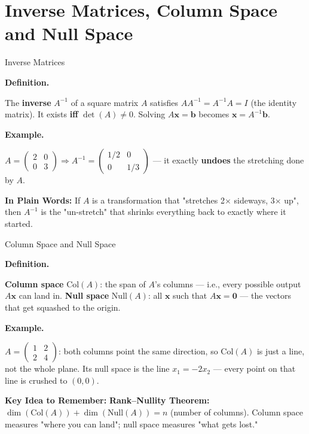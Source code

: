 \documentclass[9pt,aspectratio=169]{beamer}
\newcommand{\keyidea}[1]{%
\par\medskip\noindent\textbf{Key Idea to Remember:} #1\par\medskip}
\newcommand{\childex}[1]{%
\par\medskip\noindent\textbf{In Plain Words:} #1\par\medskip}
\begin{document}
\section{Inverse Matrices, Column Space and Null Space}

\begin{frame}{Inverse Matrices}
\par\noindent\textbf{Definition.}\par
The \textbf{inverse} $A^{-1}$ of a square matrix $A$ satisfies $AA^{-1}=A^{-1}A=I$ (the
identity matrix). It exists \textbf{iff} $\det(A)\neq 0$. Solving $A\mathbf{x}=\mathbf{b}$
becomes $\mathbf{x}=A^{-1}\mathbf{b}$.
\medskip


\par\noindent\textbf{Example.}\par
$A=\begin{pmatrix}2&0\\0&3\end{pmatrix} \Rightarrow A^{-1}=\begin{pmatrix}1/2&0\\0&1/3
\end{pmatrix}$ --- it exactly \textbf{undoes} the stretching done by $A$.
\medskip


\childex{If $A$ is a transformation that "stretches 2$\times$ sideways, 3$\times$ up",
then $A^{-1}$ is the "un-stretch" that shrinks everything back to exactly where it
started.}
\end{frame}

\begin{frame}{Column Space and Null Space}
\par\noindent\textbf{Definition.}\par
\textbf{Column space} $\text{Col}(A)$: the span of $A$'s columns --- i.e., every possible
output $A\mathbf{x}$ can land in.
\textbf{Null space} $\text{Null}(A)$: all $\mathbf{x}$ such that $A\mathbf{x}=\mathbf{0}$
--- the vectors that get squashed to the origin.
\medskip


\par\noindent\textbf{Example.}\par
$A=\begin{pmatrix}1&2\\2&4\end{pmatrix}$: both columns point the same direction, so
$\text{Col}(A)$ is just a line, not the whole plane. Its null space is the line
$x_1 = -2x_2$ --- every point on that line is crushed to $(0,0)$.
\medskip


\keyidea{\textbf{Rank--Nullity Theorem:} $\dim(\text{Col}(A)) + \dim(\text{Null}(A)) = n$
(number of columns). Column space measures "where you can land"; null space measures
"what gets lost."}
\end{frame}
\end{document}
